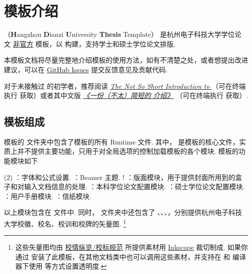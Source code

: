 \section{ 模板介绍}

（\textbf Hangzhou \textbf Dianzi \textbf University  \textbf{Thesis} Template） 是杭州电子科技大学学位论文 \underline{非官方}  模板，以  构建，支持学士和硕士学位论文排版.

本模板文档将尽量完整地介绍模板的使用方法，如有不清楚之处，或者想提出改进建议，可以在 \href{https://github.com/myhsia/hduthesis/issues}{GitHub Issues} 提交反馈意见及贡献代码.

对于未接触过  的初学者，推荐阅读
\href{https://tug.ctan.org/info/lshort/english/lshort.pdf}
  {\emph{The Not So Short Introduction to }}
（可在终端执行  获取）或者其中文版
\href{http://mirrors.ctan.org/info/lshort/chinese/lshort-zh-cn.pdf}
  {\emph{《一份（不太）简短的  介绍》}}
（可在终端执行  获取）.

\subsection{模板组成}

 模板的  文件夹中包含了模板的所有 Runtime 文件.
其中， 是模板的核心文件，实质上并不提供主要功能，只用于对全局选项的控制加载模板的各个模块. 模板的功能模块如下

\begin{tasks}(2)
  \task {}：字体和公式设置.
  \task {}：Beamer 主题.
  \task! ：版面模块，用于提供封面所用到的盒子和对输入文档信息的处理.
  \task {}：本科学位论文配置模块.
  \task {}：硕士学位论文配置模块.
  \task {}：用户手册模块.
  \task {}：信纸模块.
\end{tasks}

以上模块包含在  文件中.
同时， 文件夹中还包含了 、、、，分别提供杭州电子科技大学校徽、校名、校训和校牌的矢量图.
\footnote
  {
    这些矢量图均由 \href{https://www.hdu.edu.cn/666/list.htm}{校情纵览/校标规范} 所提供素材用 \href{https://inkscape.org}{Inkscape} 裁切制成. 如果你通过  安装了此模板，在其他文档类中也可以调用这些素材，并支持在  和  编译器下使用  等方式设置透明度.
  }

